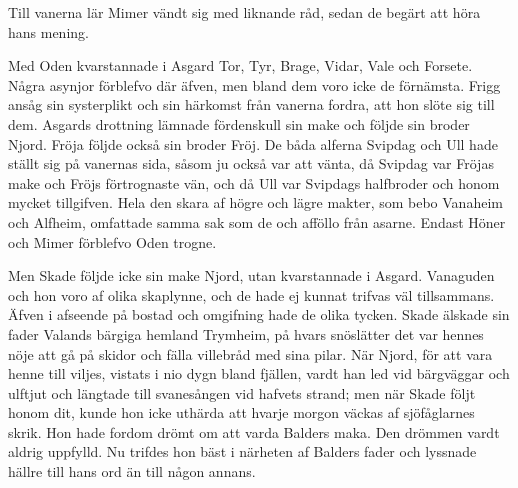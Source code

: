 Till vanerna lär Mimer vändt sig med liknande råd, sedan de begärt att
höra hans mening.

Med Oden kvarstannade i Asgard Tor, Tyr, Brage, Vidar, Vale och Forsete.
Några asynjor förblefvo där äfven, men bland dem voro icke de förnämsta.
Frigg ansåg sin systerplikt och sin härkomst från vanerna fordra, att
hon slöte sig
\protect\hypertarget{lb1625905.xhtmlux5cux23start145}{}{}\protect\hypertarget{lb1625905.xhtmlux5cux23start145-a}{}{}\protect\hypertarget{lb1625905.xhtmlux5cux23start145-b}{}{}\protect\hypertarget{lb1625905.xhtmlux5cux23start145-c}{}{}\protect\hypertarget{lb1625905.xhtmlux5cux23start145-d}{}{}
till dem. Asgards drottning lämnade fördenskull sin make och följde sin
broder Njord. Fröja följde också sin broder Fröj. De båda alferna
Svipdag och Ull hade ställt sig på vanernas sida, såsom ju också var att
vänta, då Svipdag var Fröjas make och Fröjs förtrognaste vän, och då Ull
var Svipdags halfbroder och honom mycket tillgifven. Hela den skara af
högre och lägre makter, som bebo Vanaheim och Alfheim, omfattade samma
sak som de och afföllo från asarne. Endast Höner och Mimer förblefvo
Oden trogne.

Men Skade följde icke sin make Njord, utan kvarstannade i Asgard.
Vanaguden och hon voro af olika skaplynne, och de hade ej kunnat trifvas
väl tillsammans. Äfven i afseende på bostad och omgifning hade de olika
tycken. Skade älskade sin fader Valands bärgiga hemland Trymheim, på
hvars snöslätter det var hennes nöje att gå på skidor och fälla
villebråd med sina pilar. När Njord, för att vara henne till viljes,
vistats i nio dygn bland fjällen, vardt han led vid bärgväggar och
ulftjut och längtade till svanesången vid hafvets strand; men när Skade
följt honom dit, kunde hon icke uthärda att hvarje morgon väckas af
sjöfåglarnes skrik. Hon hade fordom drömt om att varda Balders maka. Den
drömmen vardt aldrig uppfylld. Nu trifdes hon bäst i närheten af Balders
fader och lyssnade hällre till hans ord än till någon annans.

